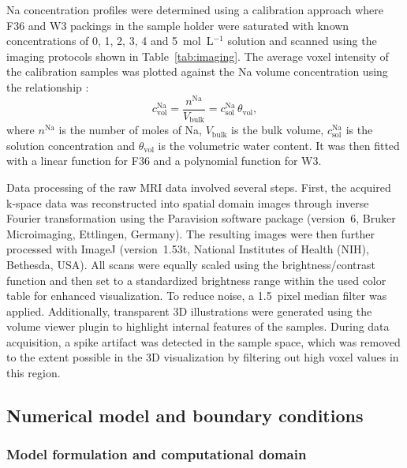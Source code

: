 \documentclass[final]{agujournal2019}
\begin{document}
Na concentration profiles were determined using a calibration approach where F36
and W3 packings in the sample holder were saturated with known concentrations of
0, 1, 2, 3, 4 and 5~mol~L$^{-1}$ solution and scanned using the imaging
protocols shown in Table~\ref{tab:imaging}. The average voxel intensity of the
calibration samples was plotted against the Na volume concentration using the
relationship \cite{perelman2020}:
\begin{equation}
c_{\mathrm{vol}}^{\mathrm{Na}} = \frac{n^{\mathrm{Na}}}{V_{\mathrm{bulk}}}
= c_{\mathrm{sol}}^{\mathrm{Na}}\,\theta_{\mathrm{vol}},
\label{eq:calibration}
\end{equation}
where $n^{\mathrm{Na}}$ is the number of moles of Na, $V_{\mathrm{bulk}}$ is the
bulk volume, $c_{\mathrm{sol}}^{\mathrm{Na}}$ is the solution concentration and
$\theta_{\mathrm{vol}}$ is the volumetric water content. It was then fitted with
a linear function for F36 and a polynomial function for W3.

Data processing of the raw MRI data involved several steps. First, the acquired
k-space data was reconstructed into spatial domain images through inverse Fourier
transformation using the Paravision software package (version~6, Bruker
Microimaging, Ettlingen, Germany). The resulting images were then further
processed with ImageJ (version~1.53t, National Institutes of Health (NIH),
Bethesda, USA). All scans were equally scaled using the brightness/contrast
function and then set to a standardized brightness range within the used color
table for enhanced visualization. To reduce noise, a 1.5~pixel median filter was
applied. Additionally, transparent 3D illustrations were generated using the
volume viewer plugin to highlight internal features of the samples. During data
acquisition, a spike artifact was detected in the sample space, which was removed
to the extent possible in the 3D visualization by filtering out high voxel values
in this region.

\subsection{Numerical model and boundary conditions} \label{sec:numerical-model}

\subsubsection{Model formulation and computational domain}
\end{document}
